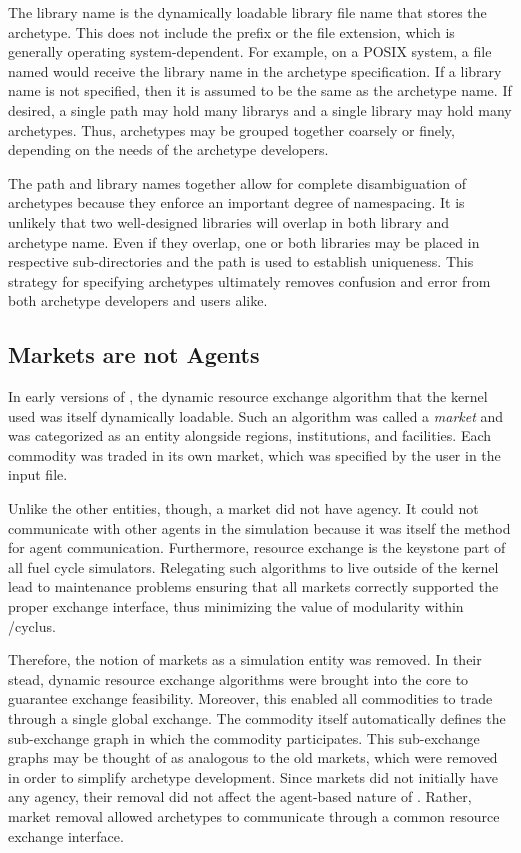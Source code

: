 The library name is the dynamically loadable library file name that stores the 
archetype. This does not include the  prefix or the file extension, 
which is generally operating system-dependent.  For example, on a
POSIX system,
a file named  would receive the library name 
in the archetype specification. 
If a library name is not specified, then it is assumed to be the same as the 
archetype name.
If desired, a single path may hold many librarys and a single library may hold
many archetypes. Thus, archetypes may be grouped
together coarsely or finely, depending on the needs of the archetype developers.

The path and library names together allow for complete disambiguation of 
archetypes because they enforce an important degree of namespacing.  It is unlikely
that two well-designed libraries will overlap in both library and archetype name.
Even if they overlap, one or both libraries may be placed in respective
sub-directories and the path is used to establish uniqueness.
This strategy for specifying archetypes ultimately removes confusion and error from 
both archetype developers and users alike.

\subsection{Markets are not Agents}

In early versions of \cyclus, the dynamic resource exchange algorithm that the 
kernel used was itself dynamically loadable. Such an algorithm was called a
\emph{market} and was categorized as an entity alongside regions,
institutions, and facilities. 
Each commodity was traded in its own market, which was specified by 
the user in the input file.

Unlike the other entities, though, a market did not have agency.  It could not 
communicate with other agents in the simulation because it was itself the method
for agent communication.  Furthermore, resource exchange is the keystone
part of all fuel cycle simulators. 
Relegating such algorithms to live outside of 
the kernel lead to maintenance problems 
ensuring that all markets correctly supported the proper exchange interface,
thus minimizing the value of modularity within /cyclus.

Therefore, the notion of markets as a simulation entity was removed. In their 
stead, dynamic resource exchange algorithms were brought into the core to
guarantee exchange feasibility. Moreover, this enabled all commodities to trade 
through a single global exchange. The commodity itself automatically defines 
the sub-exchange graph in which the commodity participates.
This sub-exchange graphs may be thought of as analogous to the old 
markets, which were removed in order to simplify archetype development.
Since markets did not initially have any agency, their removal did not 
affect the agent-based
nature of \cyclus.  Rather, market removal allowed archetypes to 
communicate through a common resource exchange interface.

